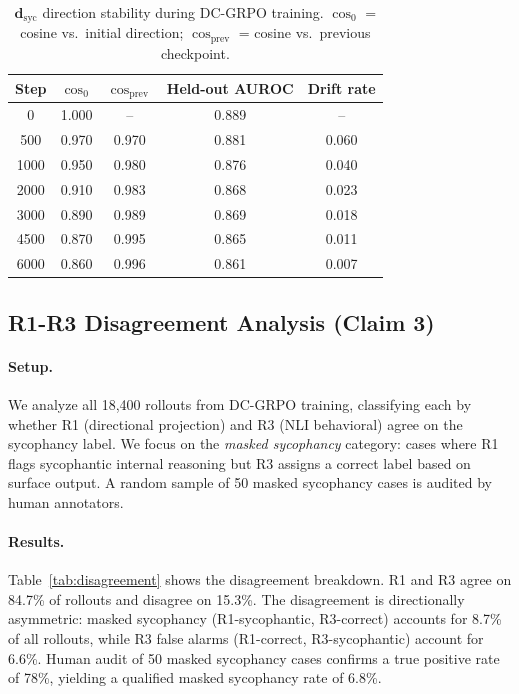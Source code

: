 \documentclass[11pt]{article}
\begin{document}
\begin{table}[h]
\centering
\caption{$\mathbf{d}_\text{syc}$ direction stability during DC-GRPO training. $\cos_0$ = cosine vs.\ initial direction; $\cos_\text{prev}$ = cosine vs.\ previous checkpoint.}
\label{tab:stability}
\begin{tabular}{ccccc}
\toprule
Step & $\cos_0$ & $\cos_\text{prev}$ & Held-out AUROC & Drift rate \\
\midrule
0    & 1.000 & --    & 0.889 & --    \\
500  & 0.970 & 0.970 & 0.881 & 0.060 \\
1000 & 0.950 & 0.980 & 0.876 & 0.040 \\
2000 & 0.910 & 0.983 & 0.868 & 0.023 \\
3000 & 0.890 & 0.989 & 0.869 & 0.018 \\
4500 & 0.870 & 0.995 & 0.865 & 0.011 \\
6000 & 0.860 & 0.996 & 0.861 & 0.007 \\
\bottomrule
\end{tabular}
\end{table}

\subsection{R1-R3 Disagreement Analysis (Claim 3)}
\label{sec:disagreement}

\paragraph{Setup.}
We analyze all 18,400 rollouts from DC-GRPO training, classifying each by whether R1 (directional projection) and R3 (NLI behavioral) agree on the sycophancy label. We focus on the \emph{masked sycophancy} category: cases where R1 flags sycophantic internal reasoning but R3 assigns a correct label based on surface output. A random sample of 50 masked sycophancy cases is audited by human annotators.

\paragraph{Results.}
Table~\ref{tab:disagreement} shows the disagreement breakdown. R1 and R3 agree on 84.7\% of rollouts and disagree on 15.3\%. The disagreement is directionally asymmetric: masked sycophancy (R1-sycophantic, R3-correct) accounts for 8.7\% of all rollouts, while R3 false alarms (R1-correct, R3-sycophantic) account for 6.6\%. Human audit of 50 masked sycophancy cases confirms a true positive rate of 78\%, yielding a qualified masked sycophancy rate of 6.8\%.
\end{document}
